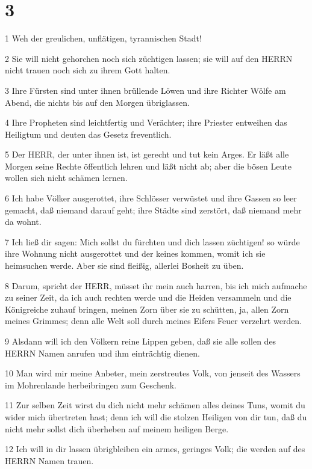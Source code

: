 \chapter{3}

\par 1 Weh der greulichen, unflätigen, tyrannischen Stadt!
\par 2 Sie will nicht gehorchen noch sich züchtigen lassen; sie will auf den HERRN nicht trauen noch sich zu ihrem Gott halten.
\par 3 Ihre Fürsten sind unter ihnen brüllende Löwen und ihre Richter Wölfe am Abend, die nichts bis auf den Morgen übriglassen.
\par 4 Ihre Propheten sind leichtfertig und Verächter; ihre Priester entweihen das Heiligtum und deuten das Gesetz freventlich.
\par 5 Der HERR, der unter ihnen ist, ist gerecht und tut kein Arges. Er läßt alle Morgen seine Rechte öffentlich lehren und läßt nicht ab; aber die bösen Leute wollen sich nicht schämen lernen.
\par 6 Ich habe Völker ausgerottet, ihre Schlösser verwüstet und ihre Gassen so leer gemacht, daß niemand darauf geht; ihre Städte sind zerstört, daß niemand mehr da wohnt.
\par 7 Ich ließ dir sagen: Mich sollst du fürchten und dich lassen züchtigen! so würde ihre Wohnung nicht ausgerottet und der keines kommen, womit ich sie heimsuchen werde. Aber sie sind fleißig, allerlei Bosheit zu üben.
\par 8 Darum, spricht der HERR, müsset ihr mein auch harren, bis ich mich aufmache zu seiner Zeit, da ich auch rechten werde und die Heiden versammeln und die Königreiche zuhauf bringen, meinen Zorn über sie zu schütten, ja, allen Zorn meines Grimmes; denn alle Welt soll durch meines Eifers Feuer verzehrt werden.
\par 9 Alsdann will ich den Völkern reine Lippen geben, daß sie alle sollen des HERRN Namen anrufen und ihm einträchtig dienen.
\par 10 Man wird mir meine Anbeter, mein zerstreutes Volk, von jenseit des Wassers im Mohrenlande herbeibringen zum Geschenk.
\par 11 Zur selben Zeit wirst du dich nicht mehr schämen alles deines Tuns, womit du wider mich übertreten hast; denn ich will die stolzen Heiligen von dir tun, daß du nicht mehr sollst dich überheben auf meinem heiligen Berge.
\par 12 Ich will in dir lassen übrigbleiben ein armes, geringes Volk; die werden auf des HERRN Namen trauen.
